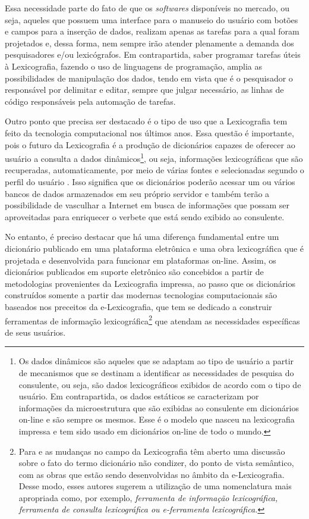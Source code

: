 \documentclass[portuguese]{textolivre}
\begin{document}
Essa necessidade parte do fato de que os \emph{softwares} disponíveis no mercado, ou seja, aqueles que possuem uma interface para o manuseio do usuário com botões e campos para a inserção de dados, realizam apenas as tarefas para a qual foram projetados e, dessa forma, nem sempre irão atender plenamente a demanda dos pesquisadores e/ou lexicógrafos. Em contrapartida, saber programar tarefas úteis à Lexicografia, fazendo o uso de linguagens de programação, amplia as possibilidades de manipulação dos dados, tendo em vista que é o pesquisador o responsável por delimitar e editar, sempre que julgar necessário, as linhas de código responsáveis pela automação de tarefas.

Outro ponto que precisa ser destacado é o tipo de uso que a Lexicografia tem feito da tecnologia computacional nos últimos anos. Essa questão é importante, pois o futuro da Lexicografia é a produção de dicionários capazes de oferecer ao usuário a consulta a dados dinâmicos\footnote{Os dados dinâmicos são aqueles que se adaptam ao tipo de usuário a partir de mecanismos que se destinam a identificar as necessidades de pesquisa do consulente, ou seja, são dados lexicográficos exibidos de acordo com o tipo de usuário. Em contrapartida, os dados estáticos se caracterizam por informações da microestrutura que são exibidas ao consulente em dicionários on-line e são sempre os mesmos. Esse é o modelo que nasceu na lexicografia impressa e tem sido usado em dicionários on-line de todo o mundo.}, ou seja, informações lexicográficas que são recuperadas, automaticamente, por meio de várias fontes e selecionadas segundo o perfil do usuário \cite[p. 63]{tarp2011}. Isso significa que os dicionários poderão acessar um ou vários bancos de dados armazenados em seu próprio servidor e também terão a possibilidade de vasculhar a Internet em busca de informações que possam ser aproveitadas para enriquecer o verbete que está sendo exibido ao consulente.

No entanto, é preciso destacar que há uma diferença fundamental entre um dicionário publicado em uma plataforma eletrônica e uma obra lexicográfica que é projetada e desenvolvida para funcionar em plataformas on-line. Assim, os dicionários publicados em suporte eletrônico são concebidos a partir de metodologias provenientes da Lexicografia impressa, ao passo que os dicionários construídos somente a partir das modernas tecnologias computacionais são baseados nos preceitos da e-Lexicografia, que tem se dedicado a construir ferramentas de informação lexicográfica\footnote{Para \textcite[p. 2]{fuertes2011} e \textcite[p. 69]{tarp2011} as mudanças no campo da Lexicografia têm aberto uma discussão sobre o fato do termo dicionário não condizer, do ponto de vista semântico, com as obras que estão sendo desenvolvidas no âmbito da e-Lexicografia. Desse modo, esses autores sugerem a utilização de uma nomenclatura mais apropriada como, por exemplo, \emph{ferramenta de informação lexicográfica, ferramenta de consulta lexicográfica ou e-ferramenta lexicográfica.}} que atendam as necessidades específicas de seus usuários.
\end{document}
